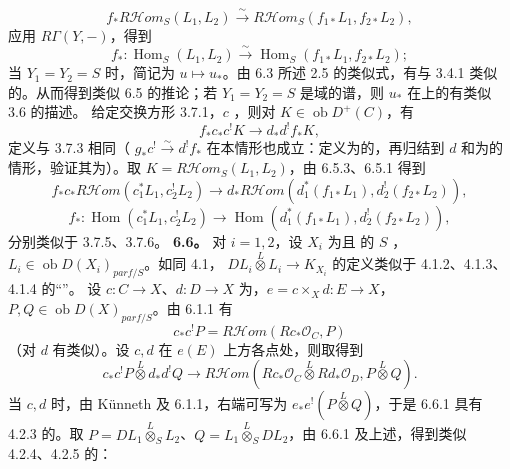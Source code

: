\[f_*R\mathcal Hom_S(L_1,L_2)\xrightarrow\sim R\mathcal Hom_S(f_{1*}L_1,f_{2*}L_2),\tag{6.5.1}\]
应用 $R\Gamma(Y,-)$，得到
\[f_*:\operatorname{Hom}_S(L_1,L_2)\xrightarrow\sim\operatorname{Hom}_S(f_{1*}L_1,f_{2*}L_2);\tag{6.5.2}\]
当 $Y_1=Y_2=S$ 时，简记为 $u\mapsto u_*$。由 6.3 所述 2.5 的类似式，有与 3.4.1 类似的。从而得到类似 6.5 的推论；若 $Y_1=Y_2=S$ 是域的谱，则 $u_*$ 在上的有类似 3.6 的描述。
给定交换方形 3.7.1，$c$ ，则对 $K\in\operatorname{ob}D^+(C)$，有
\[f_*c_*c^!K\longrightarrow d_*d^!f_*K,\tag{6.5.3}\]
定义与 3.7.3 相同（ $g_*c^!\xrightarrow\sim d^!f_*$ 在本情形也成立：定义为的，再归结到 $d$ 和为的情形，验证其为）。取 $K=R\mathcal Hom_S(L_1,L_2)$，由 6.5.3、6.5.1 得到
\[f_*c_*R\mathcal Hom(c_1^*L_1,c_2^!L_2)\longrightarrow d_*R\mathcal Hom(d_1^*(f_{1*}L_1),d_2^!(f_{2*}L_2)),\tag{6.5.4}\]
\[f_*:\operatorname{Hom}(c_1^*L_1,c_2^!L_2)\longrightarrow\operatorname{Hom}(d_1^*(f_{1*}L_1),d_2^!(f_{2*}L_2)),\tag{6.5.5}\]
分别类似于 3.7.5、3.7.6。
\textbf{6.6。} 对 $i=1,2$，设 $X_i$ 为且 的 $S$ ，$L_i\in\operatorname{ob}D(X_i)_{parf/S}$。如同 4.1， $DL_i\mathbin{\overset L\otimes}L_i\to K_{X_i}$ 的定义类似于 4.1.2、4.1.3、4.1.4 的“”。
设 $c:C\to X$、$d:D\to X$ 为，$e=c\times_Xd:E\to X$，$P,Q\in\operatorname{ob}D(X)_{parf/S}$。由 6.1.1 有
\[c_*c^!P=R\mathcal Hom(Rc_*\mathcal O_C,P)\]
（对 $d$ 有类似）。设 $c,d$ 在 $e(E)$ 上方各点处，则取得到
\[c_*c^!P\mathbin{\overset L\otimes}d_*d^!Q\longrightarrow R\mathcal Hom(Rc_*\mathcal O_C\mathbin{\overset L\otimes}Rd_*\mathcal O_D,P\mathbin{\overset L\otimes}Q).\tag{6.6.1}\]
当 $c,d$ 时，由 Künneth 及 6.1.1，右端可写为 $e_*e^!(P\mathbin{\overset L\otimes}Q)$，于是 6.6.1 具有 4.2.3 的。取 $P=DL_1\mathbin{\overset L\otimes}_SL_2$、$Q=L_1\mathbin{\overset L\otimes}_SDL_2$，由 6.6.1 及上述，得到类似 4.2.4、4.2.5 的：
